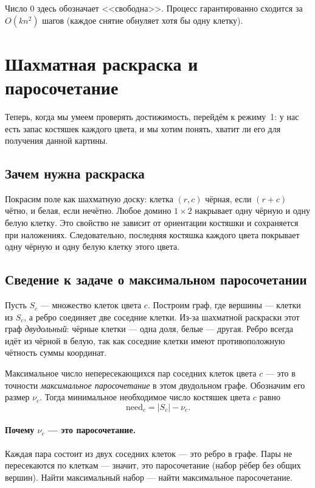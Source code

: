 \documentclass[12pt,a4paper]{article}
\begin{document}
Число $0$ здесь обозначает <<свободна>>. Процесс гарантированно
сходится за $O(kn^2)$ шагов (каждое снятие обнуляет хотя бы одну клетку).

\section{Шахматная раскраска и паросочетание}

Теперь, когда мы умеем проверять достижимость, перейдём к режиму~1:
у нас есть запас костяшек каждого цвета, и мы хотим понять, хватит ли
его для получения данной картины.

\subsection{Зачем нужна раскраска}

Покрасим поле как шахматную доску: клетка $(r,c)$ чёрная, если
$(r+c)$ чётно, и белая, если нечётно. Любое домино $1\times2$ накрывает
одну чёрную и одну белую клетку. Это свойство не зависит от ориентации
костяшки и сохраняется при наложениях. Следовательно, последняя костяшка
каждого цвета покрывает одну чёрную и одну белую клетку этого цвета.

\subsection{Сведение к задаче о максимальном паросочетании}

Пусть $S_c$ --- множество клеток цвета $c$. Построим граф, где вершины
--- клетки из $S_c$, а ребро соединяет две соседние клетки. Из-за
шахматной раскраски этот граф \emph{двудольный}: чёрные клетки --- одна
доля, белые --- другая. Ребро всегда идёт из чёрной в белую, так как
соседние клетки имеют противоположную чётность суммы координат.

Максимальное число непересекающихся пар соседних клеток цвета $c$ ---
это в точности \emph{максимальное паросочетание} в этом двудольном графе.
Обозначим его размер $\nu_c$. Тогда минимальное необходимое число
костяшек цвета $c$ равно
\[
  \mathrm{need}_c = |S_c| - \nu_c .
\]

\paragraph{Почему $\nu_c$ --- это паросочетание.}
Каждая пара состоит из двух соседних клеток --- это ребро в графе.
Пары не пересекаются по клеткам --- значит, это паросочетание (набор
рёбер без общих вершин). Найти максимальный набор --- найти максимальное
паросочетание.
\end{document}

